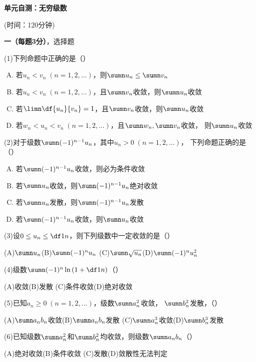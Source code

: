 \begin{center}
	{\Large\bf 单元自测：无穷级数}
	
	(时间：120分钟)
\end{center}

{\bf 一（每题3分）}，选择题

(1)\;下列命题中正确的是（\quad）%
\begin{enumerate}[(A)]
  \setlength{\itemindent}{1cm}
  \item 若$u_n<v_n\;(n=1,2,\ldots)$，则$\sumn u_n\leq \sumn v_n$
  \item 若$u_n<v_n\;(n=1,2,\ldots)$，且$\sumn v_n$收敛，则$\sumn u_n$收敛
  \item 若$\limn\df{u_n}{v_n}=1$，且$\sumn v_n$收敛，则$\sumn u_n$收敛
  \item 若$w_n<u_n<v_n\;(n=1,2,\ldots)$，且$\sumn w_n,\sumn v_n$收敛，
  则$\sumn u_n$收敛
\end{enumerate}

(2)\;对于级数$\sumn(-1)^{n-1}u_n$，其中$u_n>0\;(n=1,2,\ldots)$，
下列命题正确的是（\quad）%
\begin{enumerate}[(A)]
  \setlength{\itemindent}{1cm}
  \item 若$\sumn(-1)^{n-1}u_n$收敛，则必为条件收敛
  \item 若$\sumn u_n$收敛，则$\sumn(-1)^{n-1}u_n$绝对收敛
  \item 若$\sumn u_n$发散，则$\sumn(-1)^{n-1}u_n$发散
  \item 若$\sumn (-1)^{n-1} u_n$收敛，则$\sumn u_n$收敛
\end{enumerate}

(3)\;设$0\leq u_n\leq \df1n$，则下列级数中一定收敛的是（\quad）%

\quad (A)\;$\sumn u_n$\quad(B)\;$\sumn (-1)^n u_n$
\quad (C)\;$\sumn \sqrt{u_n}$\quad(D)\;$\sumn (-1)^nu_n^2$

(4)\;级数$\sumn(-1)^n\ln\left(1+\df1n\right)$（\quad）%

\quad (A)\;收敛\quad(B)\;发散
\quad (C)\;条件收敛\quad(D)\;绝对收敛

(5)\;已知$a_n\geq 0\;(n=1,2,\ldots)$，级数$\sumn a_n^2$收敛，
$\sumn b_n^2$发散，（\quad）%

\quad (A)\;$\sumn a_nb_n$收敛\quad(B)\;$\sumn a_nb_n$发散
\quad (C)\;$\sumn a_n^3$收敛\quad(D)\;$\sumn b_n^3$发散

(6)\;已知级数$\sumn a_n^2$和$\sumn b_n^2$均收敛，则级数$\sumn a_nb_n$（\quad）%

\quad (A)\;绝对收敛\quad(B)\;条件收敛
\quad (C)\;发散\quad(D)\;敛散性无法判定

